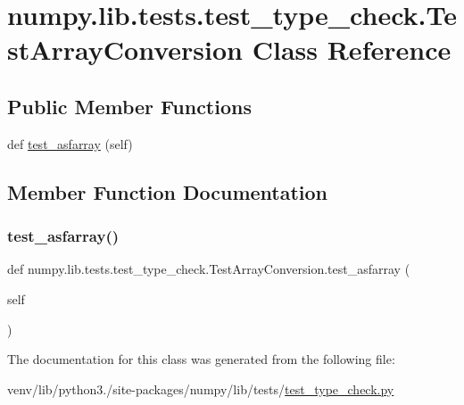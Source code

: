 \hypertarget{classnumpy_1_1lib_1_1tests_1_1test__type__check_1_1TestArrayConversion}{}\section{numpy.\+lib.\+tests.\+test\+\_\+type\+\_\+check.\+Test\+Array\+Conversion Class Reference}
\label{classnumpy_1_1lib_1_1tests_1_1test__type__check_1_1TestArrayConversion}
\subsection*{Public Member Functions}
\begin{DoxyCompactItemize}
\item 
def \hyperlink{classnumpy_1_1lib_1_1tests_1_1test__type__check_1_1TestArrayConversion_a7eaa2ada8a4d2be3b3a3374a268968f5}{test\+\_\+asfarray} (self)
\end{DoxyCompactItemize}


\subsection{Member Function Documentation}
\mbox{\label{classnumpy_1_1lib_1_1tests_1_1test__type__check_1_1TestArrayConversion_a7eaa2ada8a4d2be3b3a3374a268968f5}} 
\subsubsection{\texorpdfstring{test\+\_\+asfarray()}{test\_asfarray()}}
{\footnotesize\ttfamily def numpy.\+lib.\+tests.\+test\+\_\+type\+\_\+check.\+Test\+Array\+Conversion.\+test\+\_\+asfarray (\begin{DoxyParamCaption}\item[{}]{self }\end{DoxyParamCaption})}



The documentation for this class was generated from the following file\+:\begin{DoxyCompactItemize}
\item 
venv/lib/python3./site-\/packages/numpy/lib/tests/\hyperlink{test__type__check_8py}{test\+\_\+type\+\_\+check.\+py}\end{DoxyCompactItemize}
